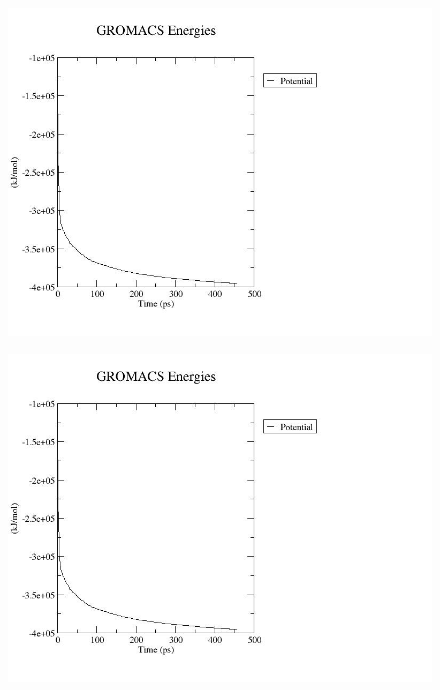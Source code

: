 \documentclass{article}
\begin{document}
 \begin{figure}[H]
    \centering
    \begin{minipage}{.5\textwidth}
          \centering
          \includegraphics[width=\linewidth]{potential.jpg}
          \label{fig:Enrg1}
    \end{minipage}%
    \begin{minipage}{.5\textwidth}
          \centering
          \includegraphics[width=\linewidth]{potential2.jpg}
          \label{fig:Enrg2}
    \end{minipage}
\end{figure}
\end{document}
